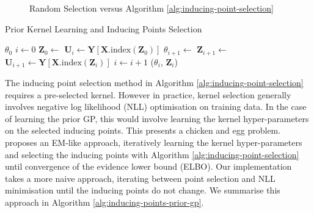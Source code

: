 \documentclass{article}
\numberwithin{equation}{section}
\begin{document}
\begin{figure}[h!]
\begin{minipage}{.25\textwidth}
\end{minipage}%
\caption{Random Selection versus Algorithm \ref{alg:inducing-point-selection}}\label{fig:inducing-point-algo}
\end{figure}

\begin{algorithm}[h!]
\caption{Prior Kernel Learning and Inducing Points Selection}\label{alg:inducing-points-prior-gp}
\begin{algorithmic}
\Require $\theta_0$ 
 \State $i \leftarrow 0$
  \State $\mathbf{Z}_0 \leftarrow$  
  \State $\mathbf{U}_i \leftarrow \mathbf{Y}\left[\mathbf{X}.\text{index}\left(\mathbf{Z}_0\right)\right]$ 
\State $\theta_{i+1} \leftarrow$  
\State $\mathbf{Z}_{i+1} \leftarrow$ 
\State $\mathbf{U}_{i+1} \leftarrow \mathbf{Y}\left[\mathbf{X}.\text{index}\left(\mathbf{Z}_i\right)\right]$
\State $i \leftarrow i+1$
\EndWhile
\State \Return ($\theta_i$, $\mathbf{Z}_i$)
\end{algorithmic}
\end{algorithm}


The inducing point selection method in Algorithm \ref{alg:inducing-point-selection} requires a pre-selected kernel.
However in practice, kernel selection generally involves negative log likelihood (NLL) optimisation on training data.
In the case of learning the prior GP, this would involve learning the kernel hyper-parameters on the selected inducing points.
This presents a chicken and egg problem.
\cite{burt2020convergence} proposes an EM-like approach, iteratively learning the kernel hyper-parameters and selecting the inducing points with Algorithm \ref{alg:inducing-point-selection} until convergence of the evidence lower bound (ELBO).
Our implementation takes a more naive approach, iterating between point selection and NLL minimisation until the inducing points do not change. 
We summarise this approach in Algorithm \ref{alg:inducing-points-prior-gp}.
\end{document}
